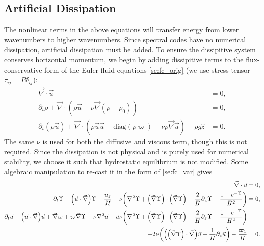\documentclass[twocolumn,
        nofootinbib, %
        usenames, %
        aps,
        prd,
        dvipsnames %
    ]{revtex4-1}%
\DeclarePairedDelimiter\p{\lparen}{\rparen}
\begin{document}
\subsection{Artificial Dissipation}

The nonlinear terms in the above equations will transfer energy from lower
wavenumbers to higher wavenumbers. Since spectral codes have no numerical
dissipation, artificial dissipation must be added. To ensure the dissipitive
system conserves horizontal momentum, we begin by adding dissipitive terms to
the flux-conservative form of the Euler fluid equations \autoref{se:fc_orig} (we
use stress tensor $\tau_{ij} = P\delta_{ij}$):
\begin{subequations}
    \begin{align}
        \vec{\nabla} \cdot \vec{u} &= 0,\\
        \partial_t \rho + \vec{\nabla} \cdot (\rho \vec{u} - \nu
            \vec{\nabla}(\rho - \rho_0)) &= 0,\label{eq:visc_cons_mom}\\
        \partial_t (\rho \vec{u}) + \vec{\nabla} \cdot (\rho \vec{u} \vec{u} +
            \mathrm{diag}(\rho \varpi) - \nu \rho \vec{\nabla}\vec{u}) + \rho g
            \hat{z} &= 0.
    \end{align}
\end{subequations}
The same $\nu$ is used for both the diffusive and viscous term, though this is
not required. Since the dissipation is not physical and is purely used for
numerical stability, we choose it such that hydrostatic equilibrium is not
modified. Some algebraic manipulation to re-cast it in the form of
\autoref{se:fc_var} gives
\begin{subequations}
    \begin{align}
        \vec{\nabla} \cdot \vec{u} &= 0,\\
        \partial_t \Upsilon + \p*{\vec{u} \cdot \vec{\nabla}} \Upsilon -
            \frac{u_z}{H} - \nu\p*{\nabla^2 \Upsilon + \p*{\vec{\nabla}
            \Upsilon} \cdot \p*{\vec{\nabla}\Upsilon} - \frac{2}{H}\partial_z
            \Upsilon + \frac{1 - e^{-\Upsilon}}{H^2}} &= 0,\\
        \partial_t \vec{u} + \p*{\vec{u} \cdot \vec{\nabla}}\vec{u} +
            \vec{\nabla} \varpi + \varpi \vec{\nabla} \Upsilon - \nu \nabla^2
            \vec{u} + \vec{u} \nu\p*{\nabla^2 \Upsilon + \p*{\vec{\nabla}
            \Upsilon} \cdot \p*{\vec{\nabla}\Upsilon} - \frac{2}{H}\partial_z
            \Upsilon + \frac{1 - e^{-\Upsilon}}{H^2}}&{}\nonumber\\
        - 2\nu \p*{\p*{\p*{\vec{\nabla}\Upsilon} \cdot \vec{\nabla}}\vec{u} -
            \frac{1}{H}\partial_z \vec{u}} - \frac{\varpi_1}{H} &= 0.
    \end{align}
\end{subequations}
\end{document}

